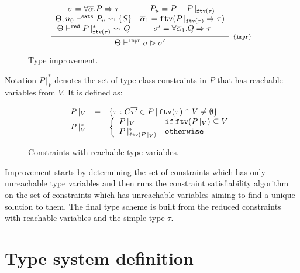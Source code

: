 \documentclass[a4paper, 11pt]{article}
\theoremstyle{definition}
\begin{document}
\begin{figure}[H]
  \[
    \infer[_{\{\mathtt{impr}\}}]
          {\Theta \impr \sigma \rhd \sigma'}
          {\begin{array}{cc}
            \sigma = \forall\overline{\alpha} . P \Rightarrow \tau & P_u = P - P\,|_{\ftv(\tau)} \\ 
            \Theta ; n_0 \vdash^{\mathtt{sats}} P_u \leadsto \{S\} & \overline{\alpha}_1 = \ftv(P\,|_{\ftv(\tau)} \Rightarrow \tau)\\
            \Theta \reduce P\,|^*_{\ftv(\tau)} \leadsto Q & \sigma' = \forall \overline{\alpha}_1 . Q\Rightarrow\tau\\ 
           \end{array}}
  \]
  \centering 
  \caption{Type improvement.}
  \label{fig:impr}
\end{figure}
 Notation $P\,|^*_{V}$ denotes the 
set of type class constraints in $P$ that has reachable variables 
from $V$. It is defined as: 
\begin{figure}[H]
  \[
    \begin{array}{lcl} 
      P\,|_{V} & = & \{\tau : C\overline{\tau'} \in P\,|\,\mathtt{ftv}(\tau) \cap V \neq \emptyset\}\\
      P\,|^{*}_{V} & = & \left\{
                  \begin{array}{ll}
                    P\,|_{V} & \mathtt{if}\:\mathtt{ftv}(P\,|_{V}) \subseteq V \\ 
                    P\,|^{*}_{\mathtt{ftv}(P\,|_{V})} & \mathtt{otherwise}\\
                  \end{array}
                   \right.
    \end{array} 
  \]
  \caption{Constraints with reachable type variables.}
  \label{fig:constrreach}
\end{figure}
Improvement starts by determining the set of constraints which 
has only unreachable type variables and then runs the constraint 
satisfiability algorithm on the set of constraints which has 
unreachable variables aiming to find a unique solution to them. 
The final type scheme is built from the reduced constraints with 
reachable variables and the simple type $\tau$.



\section{Type system definition}
\end{document}

